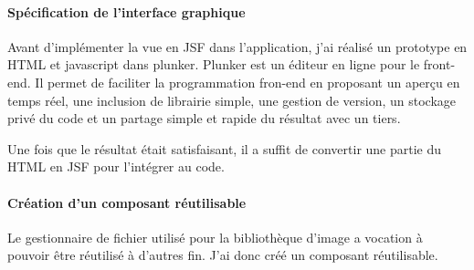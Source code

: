 \paragraph*{Spécification de l'interface graphique\\}
Avant d'implémenter la vue en JSF dans l'application, j'ai réalisé un prototype en HTML et javascript dans plunker.
Plunker est un éditeur en ligne pour le front-end. Il permet de faciliter la programmation fron-end en proposant un aperçu en temps réel, une inclusion de librairie simple, une gestion de version, un stockage privé du code et un partage simple et rapide du résultat avec un tiers.

Une fois que le résultat était satisfaisant, il a suffit de convertir une partie du HTML en JSF pour l'intégrer au code.

\paragraph*{Création d'un composant réutilisable\\}
Le gestionnaire de fichier utilisé pour la bibliothèque d'image a vocation à pouvoir être réutilisé à d'autres fin.
J'ai donc créé un composant réutilisable.

